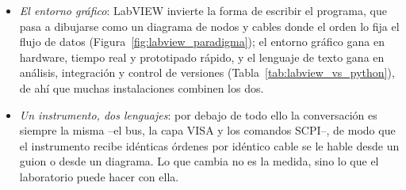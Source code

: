 \begin{itemize}
    \item \emph{El entorno gráfico}: LabVIEW invierte la forma de escribir el programa, que pasa a dibujarse como un diagrama de nodos y cables donde el orden lo fija el flujo de datos (Figura~\ref{fig:labview_paradigma}); el entorno gráfico gana en hardware, tiempo real y prototipado rápido, y el lenguaje de texto gana en análisis, integración y control de versiones (Tabla~\ref{tab:labview_vs_python}), de ahí que muchas instalaciones combinen los dos.
    \item \emph{Un instrumento, dos lenguajes}: por debajo de todo ello la conversación es siempre la misma --el bus, la capa VISA y los comandos SCPI--, de modo que el instrumento recibe idénticas órdenes por idéntico cable se le hable desde un guion o desde un diagrama. Lo que cambia no es la medida, sino lo que el laboratorio puede hacer con ella.
\end{itemize}

